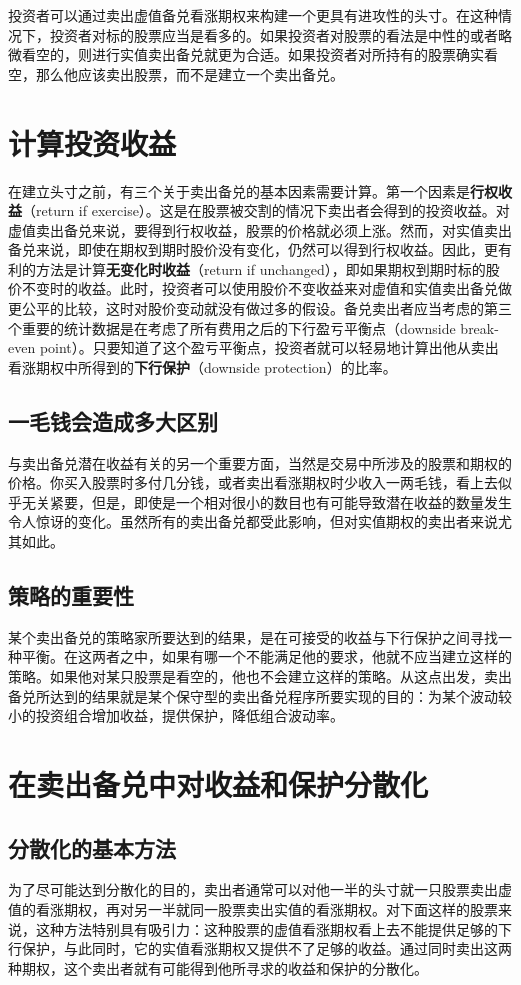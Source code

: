 投资者可以通过卖出虚值备兑看涨期权来构建一个更具有进攻性的头寸。在这种情况下，投资者对标的股票应当是看多的。如果投资者对股票的看法是中性的或者略微看空的，则进行实值卖出备兑就更为合适。如果投资者对所持有的股票确实看空，那么他应该卖出股票，而不是建立一个卖出备兑。

\section{计算投资收益}
在建立头寸之前，有三个关于卖出备兑的基本因素需要计算。第一个因素是\textbf{行权收益}（return if exercise）。这是在股票被交割的情况下卖出者会得到的投资收益。对虚值卖出备兑来说，要得到行权收益，股票的价格就必须上涨。然而，对实值卖出备兑来说，即使在期权到期时股价没有变化，仍然可以得到行权收益。因此，更有利的方法是计算\textbf{无变化时收益}（return if unchanged），即如果期权到期时标的股价不变时的收益。此时，投资者可以使用股价不变收益来对虚值和实值卖出备兑做更公平的比较，这时对股价变动就没有做过多的假设。备兑卖出者应当考虑的第三个重要的统计数据是在考虑了所有费用之后的下行盈亏平衡点（downside break-even point）。只要知道了这个盈亏平衡点，投资者就可以轻易地计算出他从卖出看涨期权中所得到的\textbf{下行保护}（downside protection）的比率。

\subsection{一毛钱会造成多大区别}
与卖出备兑潜在收益有关的另一个重要方面，当然是交易中所涉及的股票和期权的价格。你买入股票时多付几分钱，或者卖出看涨期权时少收入一两毛钱，看上去似乎无关紧要，但是，即使是一个相对很小的数目也有可能导致潜在收益的数量发生令人惊讶的变化。虽然所有的卖出备兑都受此影响，但对实值期权的卖出者来说尤其如此。

\subsection{策略的重要性}
某个卖出备兑的策略家所要达到的结果，是在可接受的收益与下行保护之间寻找一种平衡。在这两者之中，如果有哪一个不能满足他的要求，他就不应当建立这样的策略。如果他对某只股票是看空的，他也不会建立这样的策略。从这点出发，卖出备兑所达到的结果就是某个保守型的卖出备兑程序所要实现的目的：为某个波动较小的投资组合增加收益，提供保护，降低组合波动率。
\section{在卖出备兑中对收益和保护分散化}
\subsection{分散化的基本方法}
为了尽可能达到分散化的目的，卖出者通常可以对他一半的头寸就一只股票卖出虚值的看涨期权，再对另一半就同一股票卖出实值的看涨期权。对下面这样的股票来说，这种方法特别具有吸引力：这种股票的虚值看涨期权看上去不能提供足够的下行保护，与此同时，它的实值看涨期权又提供不了足够的收益。通过同时卖出这两种期权，这个卖出者就有可能得到他所寻求的收益和保护的分散化。


